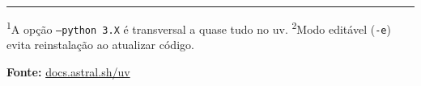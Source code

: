 \documentclass[a4paper,9pt]{article}
\begin{document}
\begin{multicols}{2}
\vfill

\hrule
\vspace{0.2em}
{\footnotesize
\textsuperscript{1}A opção \texttt{--python 3.X} é transversal a quase tudo no uv.
\textsuperscript{2}Modo editável (\texttt{-e}) evita reinstalação ao atualizar código.

\textbf{Fonte:}  \href{https://docs.astral.sh/uv/}{docs.astral.sh/uv}
}

\end{multicols}
\end{document}
